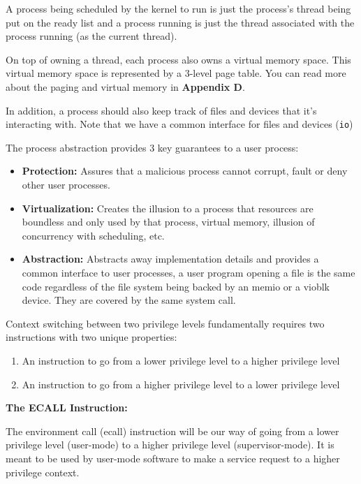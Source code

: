 \documentclass{article}
\begin{document}
	A process being scheduled by the kernel to run is just the process's thread being put on the ready list and a process running
	is just the thread associated with the process running (as the current thread).
	
	On top of owning a thread, each process also owns a virtual memory space. This virtual memory space is represented by a 3-level page table. You can read more about the paging and virtual memory
	in \textbf{Appendix D}.
	
	In addition, a process should also keep track of files and devices that it's interacting with. 
	Note that we have a common interface for files and devices (\texttt{io})
	
    The process abstraction provides 3 key guarantees to a user process:

    \begin{itemize}
        \item \textbf{Protection:} Assures that a malicious process cannot corrupt, fault or deny other user processes.
        \item \textbf{Virtualization:} Creates the illusion to a process that resources are boundless and only used by that process, \ie virtual memory, illusion of concurrency with scheduling, etc.
        \item \textbf{Abstraction:} Abstracts away implementation details and provides a common interface
    to user processes, \eg a user program opening a file is the same code regardless of the file
    system being backed by an memio or a vioblk device. They are covered by the same system call.
    \end{itemize}
    
    
    Context switching between two privilege levels fundamentally requires two instructions with two unique properties:
    
    \begin{enumerate}
        \item An instruction to go from a lower privilege level to a higher privilege level
        \item An instruction to go from a higher privilege level to a lower privilege level
    \end{enumerate}
    
    \textbf{The ECALL Instruction:}

    The environment call ({\fix ecall}) instruction will be our way of going from a lower 
    privilege level (user-mode) to a higher privilege level (supervisor-mode). It is meant to be used by user-mode software
    to make a service request to a higher privilege context.
    
\end{document}
